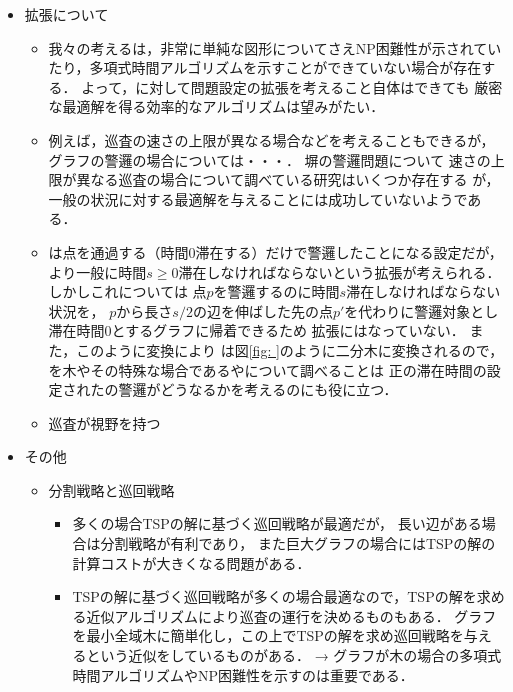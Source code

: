 \begin{itemize}
  \item 拡張について
  \begin{itemize}
    \item
      我々の考える{\patProb}は，非常に単純な図形についてさえNP困難性が示されていたり，多項式時間アルゴリズムを示すことができていない場合が存在する．
      よって，{\patProb}に対して問題設定の拡張を考えること自体はできても
      厳密な最適解を得る効率的なアルゴリズムは望みがたい．
    \item 例えば，巡査の速さの上限が異なる場合などを考えることもできるが，
      グラフの警邏の場合については・・・．
      塀の警邏問題について
      速さの上限が異なる巡査の場合について調べている研究はいくつか存在する\cite{}
      が，一般の状況に対する最適解を与えることには成功していないようである\cite{}．
    \item {\patProb}は点を通過する（時間$0$滞在する）だけで警邏したことになる設定だが，
      より一般に時間$s \geq 0$滞在しなければならないという拡張が考えられる．
      しかしこれについては
      点$p$を警邏するのに時間$s$滞在しなければならない状況を，
      $p$から長さ$s/2$の辺を伸ばした先の点$p'$を代わりに警邏対象とし滞在時間$0$とするグラフに帰着できるため
      拡張にはなっていない．
      また，このように変換により
      {\graphLine}は図\ref{fig: }のように二分木に変換されるので，
      {\patProb}を木やその特殊な場合である{\graphStar}や{\graphUnit}について調べることは
      正の滞在時間の設定された{\graphLine}の警邏がどうなるかを考えるのにも役に立つ．
    \item 巡査が視野を持つ

  \end{itemize}

  \item その他
  \begin{itemize}
    \item 分割戦略と巡回戦略
    \begin{itemize}
      \item 多くの場合TSPの解に基づく巡回戦略が最適だが，
        長い辺がある場合は分割戦略が有利であり，
        また巨大グラフの場合にはTSPの解の計算コストが大きくなる問題がある．
      \item TSPの解に基づく巡回戦略が多くの場合最適なので，TSPの解を求める近似アルゴリズムにより巡査の運行を決めるものもある．
      グラフを最小全域木に簡単化し，この上でTSPの解を求め巡回戦略を与えるという近似をしているものがある．
      → グラフが木の場合の多項式時間アルゴリズムやNP困難性を示すのは重要である．
    \end{itemize} 
  \end{itemize}
\end{itemize}




